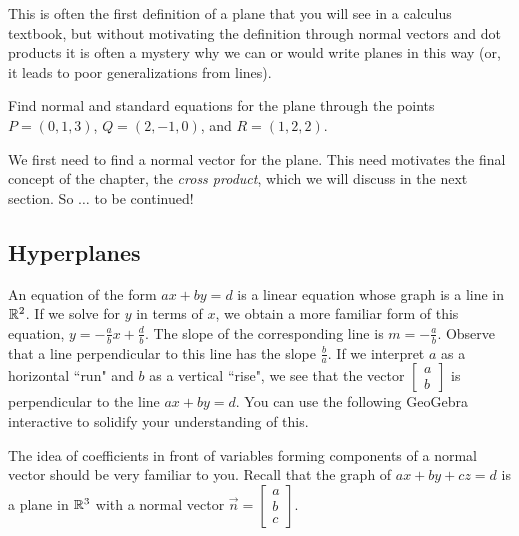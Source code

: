 \documentclass{ximera}
\begin{document}
This is often the first definition of a plane that you will see in a calculus textbook, but without motivating the definition through normal vectors and dot products it is often a mystery why we can or would write planes in this way (or, it leads to poor generalizations from lines).

\begin{example}\label{exa:normal-from-three-points}

  Find normal and standard equations for the plane through the points
  $P = (0,1,3)$, $Q=(2,-1,0)$, and $R=(1,2,2)$.
\end{example}

\begin{solution}
  We first need to find a normal vector for the plane. This need motivates the final concept of the chapter, the \emph{cross product}, which we will discuss in the next section. So $\ldots$ to be continued!

\end{solution}

\subsection*{Hyperplanes}


An equation of the form $ax+by=d$ is a linear equation whose graph is a line in $\mathbb{R}^2$. If we solve for $y$ in terms of $x$, we obtain a more familiar form of this equation, $y=-\frac{a}{b}x+\frac{d}{b}$.  The slope of the corresponding line is $m=-\frac{a}{b}$.  Observe that a line perpendicular to this line has the slope $\frac{b}{a}$.  If we interpret $a$ as a horizontal ``run" and $b$ as a vertical ``rise", we see that the vector $\begin{bmatrix}a\\b\end{bmatrix}$ is perpendicular to the line $ax+by=d$.  You can use the following GeoGebra interactive to solidify your understanding of this.
 

\begin{center}
\end{center}

 
The idea of coefficients in front of variables forming components of a normal vector should be very familiar to you.  Recall that the graph of $ax+by+cz=d$ is a plane in $\mathbb{R}^3$ with a normal vector $\vec{n}=\begin{bmatrix}a\\b\\c\end{bmatrix}$.
\end{document}
